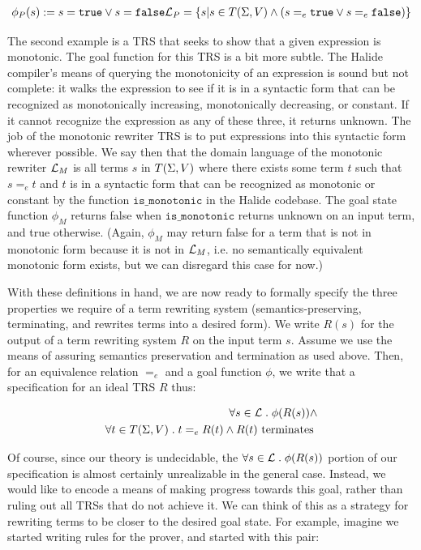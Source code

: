 \begin{align*}
    \phi_P(s) := s = \texttt{true} \vee s = \texttt{false}
    \mathcal{L}_P = \{s | s \in T(\Sigma,V) \wedge (s =_e \texttt{true} \vee s =_e \texttt{false})\} \\
\end{align*}

The second example is a TRS that seeks to show that a given expression is monotonic. The goal function for this TRS is a bit more subtle. The Halide compiler's means of querying the monotonicity of an expression is sound but not complete: it walks the expression to see if it is in a syntactic form that can be recognized as monotonically increasing, monotonically decreasing, or constant. If it cannot recognize the expression as any of these three, it returns unknown. The job of the monotonic rewriter TRS is to put expressions into this syntactic form wherever possible. We say then that the domain language of the monotonic rewriter $\mathcal{L}_M$ is all terms $s$ in $T(\Sigma,V)$ where there exists some term $t$ such that $s =_e t$ and $t$ is in a syntactic form that can be recognized as monotonic or constant by the function $\texttt{is_monotonic}$ in the Halide codebase. The goal state function $\phi_M$ returns false when $\texttt{is_monotonic}$ returns unknown on an input term, and true otherwise. (Again, $\phi_M$ may return false for a term that is not in monotonic form because it is not in $\mathcal{L}_M$, i.e. no semantically equivalent monotonic form exists, but we can disregard this case for now.)

With these definitions in hand, we are now ready to formally specify the three properties we require of a term rewriting system (semantics-preserving, terminating, and rewrites terms into a desired form). We write $R(s)$ for the output of a term rewriting system $R$ on the input term $s$. Assume we use the means of assuring semantics preservation and termination as used above. Then, for an equivalence relation $=_e$ and a goal function $\phi$, we write that a specification for an ideal TRS $R$ thus:

\begin{align*}
\forall s \in \mathcal{L} \;.\; \phi(R(s)) \wedge \\
\forall t \in T(\Sigma,V) \;.\; t =_e R(t) \wedge R(t) \textrm{ terminates }
\end{align*}

Of course, since our theory is undecidable, the $\forall s \in \mathcal{L} \;.\; \phi(R(s))$ portion of our specification is almost certainly unrealizable in the general case. Instead, we would like to encode a means of making progress towards this goal, rather than ruling out all TRSs that do not achieve it. We can think of this as a strategy for rewriting terms to be closer to the desired goal state. For example, imagine we started writing rules for the prover, and started with this pair:

